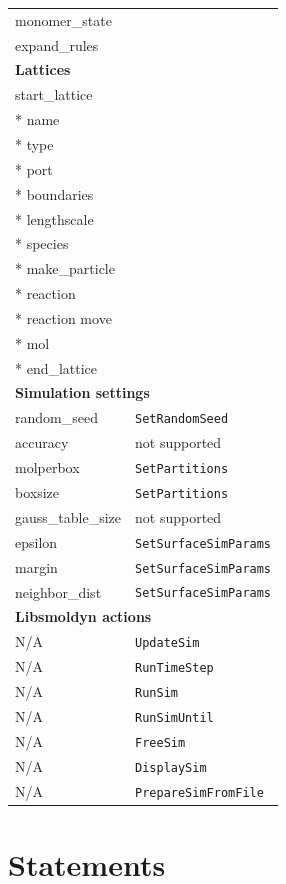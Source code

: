\documentclass {scrbook}
\newcommand {\ttt} {\texttt}
\begin{document}
\begin{longtable}[c]{ll}
monomer\_state \\ %
expand\_rules \\ %
\hline
\multicolumn{2}{l}{\hspace{0.3in}\textbf{Lattices}}\\
\hline
start\_lattice \\ %
{*} name \\ %
{*} type \\ %
{*} port \\ %
{*} boundaries \\ %
{*} lengthscale \\ %
{*} species \\ %
{*} make\_particle \\ %
{*} reaction \\ %
{*} reaction move \\ %
{*} mol \\ %
{*} end\_lattice \\ %
\hline
\multicolumn{2}{l}{\hspace{0.3in}\textbf{Simulation settings}}\\
\hline
random\_seed & \ttt{SetRandomSeed}\\
accuracy & not supported\\
molperbox & \ttt{SetPartitions}\\
boxsize & \ttt{SetPartitions}\\
gauss\_table\_size & not supported\\
epsilon & \ttt{SetSurfaceSimParams}\\
margin & \ttt{SetSurfaceSimParams}\\
neighbor\_dist & \ttt{SetSurfaceSimParams}\\
\hline
\multicolumn{2}{l}{\hspace{0.3in}\textbf{Libsmoldyn actions}}\\
\hline
N/A & \ttt{UpdateSim}\\
N/A & \ttt{RunTimeStep}\\
N/A & \ttt{RunSim}\\
N/A & \ttt{RunSimUntil}\\
N/A & \ttt{FreeSim}\\
N/A & \ttt{DisplaySim}\\
N/A & \ttt{PrepareSimFromFile}\\
\end{longtable}


\chapter{Statements}
\end{document}
